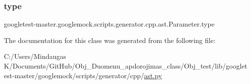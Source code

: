 \mbox{\label{classgoogletest-master_1_1googlemock_1_1scripts_1_1generator_1_1cpp_1_1ast_1_1_parameter_a8ca6ecacbb32782e16160db72ed33f86}} 
\subsubsection{\texorpdfstring{type}{type}}
{\footnotesize\ttfamily googletest-\/master.\+googlemock.\+scripts.\+generator.\+cpp.\+ast.\+Parameter.\+type}



The documentation for this class was generated from the following file\+:\begin{DoxyCompactItemize}
\item 
C\+:/\+Users/\+Mindaugas K/\+Documents/\+Git\+Hub/\+Obj\+\_\+\+Duomenu\+\_\+apdorojimas\+\_\+class/\+Obj\+\_\+test/lib/googletest-\/master/googlemock/scripts/generator/cpp/\mbox{\hyperlink{_obj__test_2lib_2googletest-master_2googlemock_2scripts_2generator_2cpp_2ast_8py}{ast.\+py}}\end{DoxyCompactItemize}
